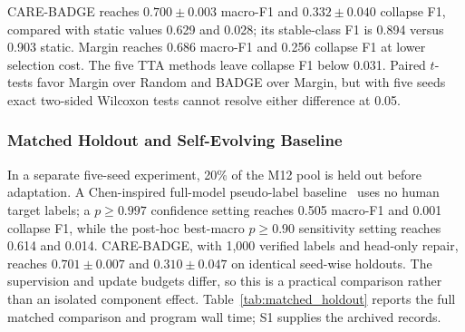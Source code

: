 \documentclass[journal]{IEEEtran}
\begin{document}
CARE-BADGE reaches $0.700\pm0.003$ macro-F1 and $0.332\pm0.040$ collapse F1, compared with static values 0.629 and 0.028; its stable-class F1 is 0.894 versus 0.903 static. Margin reaches 0.686 macro-F1 and 0.256 collapse F1 at lower selection cost. The five TTA methods leave collapse F1 below 0.031. Paired $t$-tests favor Margin over Random and BADGE over Margin, but with five seeds exact two-sided Wilcoxon tests cannot resolve either difference at 0.05.

\subsubsection{Matched Holdout and Self-Evolving Baseline}
\label{sec:matched_holdout}
In a separate five-seed experiment, 20\% of the M12 pool is held out before adaptation. A Chen-inspired full-model pseudo-label baseline~\cite{chen2025selfevolving} uses no human target labels; a $p\geq0.997$ confidence setting reaches 0.505 macro-F1 and 0.001 collapse F1, while the post-hoc best-macro $p\geq0.90$ sensitivity setting reaches 0.614 and 0.014. CARE-BADGE, with 1{,}000 verified labels and head-only repair, reaches $0.701\pm0.007$ and $0.310\pm0.047$ on identical seed-wise holdouts. The supervision and update budgets differ, so this is a practical comparison rather than an isolated component effect. Table~\ref{tab:matched_holdout} reports the full matched comparison and program wall time; S1 supplies the archived records.
\end{document}
